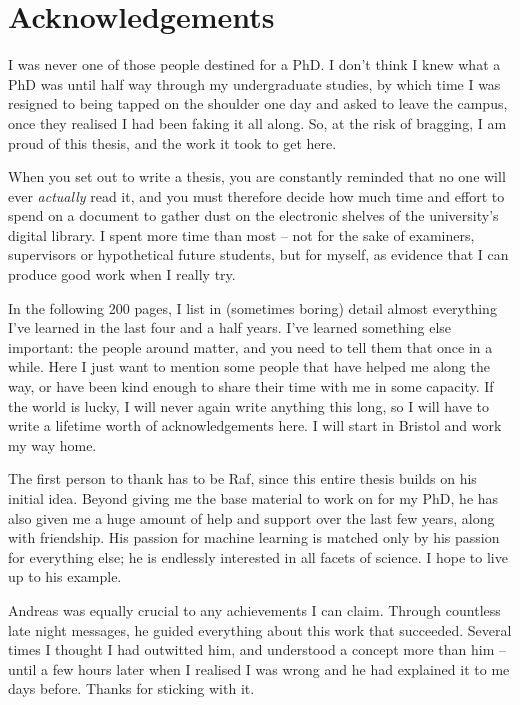 \chapter*{Acknowledgements}

I was never one of those people destined for a PhD.
I don't think I knew what a PhD was until half way through my undergraduate studies, 
    by which time I was resigned to being tapped on the shoulder one day and asked to leave the campus, 
    once they realised I had been faking it all along. 
So, at the risk of bragging, I am proud of this thesis, 
    and the work it took to get here. 
\par
When you set out to write a thesis, 
    you are constantly reminded that no one will ever \emph{actually} read it, 
    and you must therefore decide how much time and effort to spend on a document to 
    gather dust on the electronic shelves of the university's digital library. 
I spent more time than most -- 
    not for the sake of examiners, supervisors or hypothetical future students, 
    but for myself, as evidence that I can produce good work when I really try. 
\par 

In the following 200 pages, I list in (sometimes boring) detail almost everything I've learned 
    in the last four and a half years. 
I've learned something else important: 
    the people around matter, and you need to tell them that once in a while.
Here I just want to mention some people that have helped me along the way, 
    or have been kind enough to share their time with me in some capacity. 
If the world is lucky, I will never again write anything this long, 
    so I will have to write a lifetime worth of acknowledgements here. 
I will start in Bristol and work my way home. 

The first person to thank has to be Raf, since this entire thesis builds on his initial idea.
Beyond giving me the base material to work on for my PhD, 
    he has also given me a huge amount of help and support over the last few years, 
    along with friendship. 
His passion for machine learning is matched only by his passion for everything else; 
    he is endlessly interested in all facets of science. 
I hope to live up to his example. 
\par 

Andreas was equally crucial to any achievements I can claim. 
Through countless late night messages, he guided everything about this work that succeeded. 
Several times I thought I had outwitted him, and understood a concept more than him -- 
    until a few hours later when I realised I was wrong and he had explained it to me days before. 
Thanks for sticking with it. 
\par 

